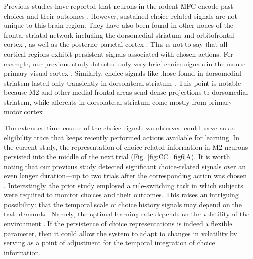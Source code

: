 Previous studies have reported that neurons in the rodent MFC encode past choices \citep{sul2011role, siniscalchi2016fast} and their outcomes \citep{kargo2007adaptation, sul2011role, yuan2014cortical}. However, sustained choice-related signals are not unique to this brain region. They have also been found in other nodes of the frontal-striatal network including the dorsomedial striatum \citep{kim2013signals} and orbitofrontal cortex \citep{sul2010distinct}, as well as the posterior parietal cortex \citep{hwang2017history}. This is not to say that all cortical regions exhibit persistent signals associated with chosen actions. For example, our previous study detected only very brief choice signals in the mouse primary visual cortex \citep{siniscalchi2016fast}. Similarly, choice signals like those found in dorsomedial striatum lasted only transiently in dorsolateral striatum \citep{kim2013signals}. This point is notable because M2 and other medial frontal areas send dense projections to dorsomedial striatum, while afferents in dorsolateral striatum come mostly from primary motor cortex \citep{reep1999topographic}.

The extended time course of the choice signals we observed could serve as an eligibility trace that keeps recently performed actions available for learning. In the current study, the representation of choice-related information in M2 neurons persisted into the middle of the next trial (Fig. \ref{fig:CC_fig6}A). It is worth noting that our previous study detected significant choice-related signals over an even longer duration---up to two trials after the corresponding action was chosen \citep{siniscalchi2016fast}. Interestingly, the prior study employed a rule-switching task in which subjects were required to monitor choices and their outcomes. This raises an intriguing possibility: that the temporal scale of choice history signals may depend on the task demands \citep{bernacchia2011reservoir, donahue2013cortical}. Namely, the optimal learning rate depends on the volatility of the environment \citep{behrens2007learning, farashahi2017metaplasticity}. If the persistence of choice representations is indeed a flexible parameter, then it could allow the system to adapt to changes in volatility by serving as a point of adjustment for the temporal integration of choice information.

